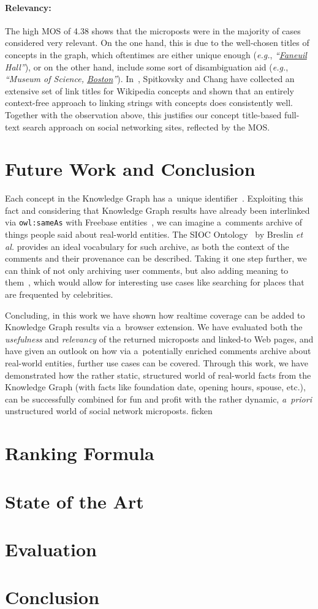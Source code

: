 \paragraph{Relevancy:} \label{sec:relevancy}
The high MOS of 4.38 shows that the microposts
were in the majority of cases considered very relevant.
On the one hand, this is due to the well-chosen titles of concepts in the graph,
which oftentimes are either unique enough (\emph{e.g.}, \emph{``\underline{Faneuil} Hall''}),
or on the other hand, include some sort of disambiguation aid
(\emph{e.g.}, \emph{``Museum of Science, \underline{Boston}''}).
In~\cite{spitkovsky2012}, Spitkovsky and Chang have collected
an extensive set of link titles for Wikipedia concepts
and shown that an entirely context-free approach
to linking strings with concepts does consistently well.
Together with the observation above, this justifies
our concept title-based full-text search approach on social networking sites,
reflected by the MOS.

\section{Future Work and Conclusion}
Each concept in the Knowledge Graph has a~unique identifier~\cite{thalhammer2012}.
Exploiting this fact and considering that Knowledge Graph results
have already been interlinked via \texttt{owl:sameAs}
with Freebase entities~\cite{glaser2012},
we can imagine a~comments archive of things people said about real-world entities.
The SIOC Ontology~\cite{breslin2005} by Breslin \emph{et al.}
provides an ideal vocabulary for such archive,
as both the context of the comments and their provenance can be described.
Taking it one step further, we can think of not only archiving user comments,
but also adding meaning to them~\cite{steiner2013},
which would allow for interesting use cases
like searching for places that are frequented by celebrities.

Concluding, in this work we have shown how realtime coverage
can be added to Knowledge Graph results via a~browser extension.
We have evaluated both the \emph{usefulness} and \emph{relevancy}
of the returned microposts and linked-to Web pages,
and have given an outlook on how via a~potentially enriched comments archive
about real-world entities, further use cases can be covered.
Through this work, we have demonstrated how the rather static, structured world
of real-world facts from the Knowledge Graph
(with facts like foundation date, opening hours, spouse, etc.),
can be successfully combined for fun and profit
with the rather dynamic, \emph{a~priori} unstructured world
of social network microposts.
ficken

\section{Ranking Formula}

\section{State of the Art}

\section{Evaluation}

\section{Conclusion}